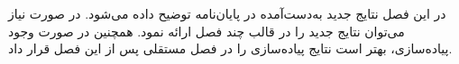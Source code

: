 
 \label{contrib}

در این فصل نتایج جدید به‌دست‌آمده در پایان‌نامه توضیح داده می‌شود.
در صورت نیاز می‌توان نتایج جدید را در قالب چند فصل ارائه نمود.
همچنین در صورت وجود پیاده‌سازی، بهتر است نتایج پیاده‌سازی را 
در فصل مستقلی پس از این فصل قرار داد.
